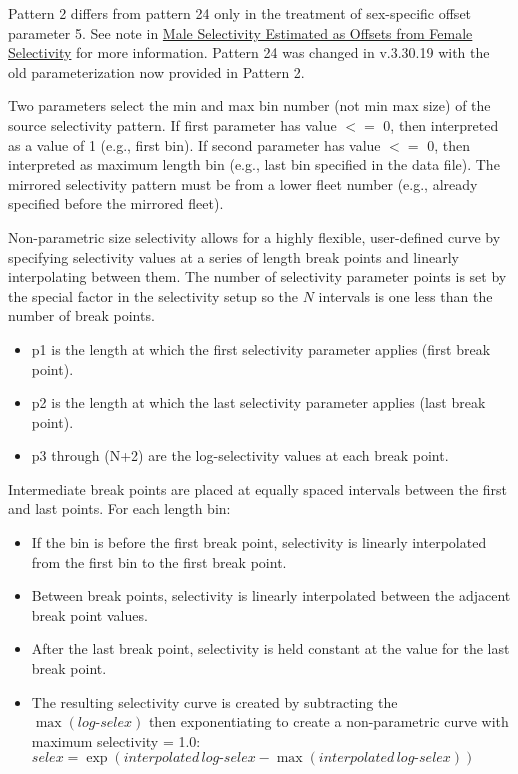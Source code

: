 \hypertarget{Pattern2}{}
Pattern 2 differs from pattern 24 only in the treatment of sex-specific offset parameter 5. See note in \hyperlink{MaleSelectivityOffset}{Male Selectivity Estimated as Offsets from Female Selectivity} for more information. Pattern 24 was changed in v.3.30.19 with the old parameterization now provided in Pattern 2.

\hypertarget{MirrorSelectivity}{}
Two parameters select the min and max bin number (not min max size) of the source selectivity pattern. If first parameter has value $<=$ 0, then interpreted as a value of 1 (e.g., first bin). If second parameter has value $<=$ 0, then interpreted as maximum length bin (e.g., last bin specified in the data file). The mirrored selectivity pattern must be from a lower fleet number (e.g., already specified before the mirrored fleet).

\hypertarget{NonParamSelectivity6}{}
Non-parametric size selectivity allows for a highly flexible, user-defined curve by specifying selectivity values at a series of length break points and linearly interpolating between them. The number of selectivity parameter points is set by the special factor in the selectivity setup so the $N$ intervals is one less than the number of break points.
	\begin{itemize}
		\item p1 is the length at which the first selectivity parameter applies (first break point).
		\item p2 is the length at which the last selectivity parameter applies (last break point).
		\item p3 through (N+2) are the log-selectivity values at each break point.
	\end{itemize}

Intermediate break points are placed at equally spaced intervals between the first and last points. For each length bin:
	\begin{itemize}
		\item If the bin is before the first break point, selectivity is linearly interpolated from the first bin to the first break point.
		\item Between break points, selectivity is linearly interpolated between the adjacent break point values.
		\item After the last break point, selectivity is held constant at the value for the last break point.
		\item The resulting selectivity curve is created by subtracting the $\max(log\text{-}selex)$ then exponentiating to create a non-parametric curve with maximum selectivity = 1.0: $selex = \exp(interpolated\,log\text{-}selex - \max(interpolated\,log\text{-}selex))$
	\end{itemize}

